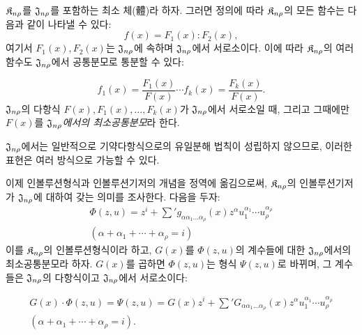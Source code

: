 $\mathfrak K_{n\rho}$를 $\mathfrak J_{n\rho}$를 포함하는 최소 체(體)라 하자. 그러면 정의에 따라 $\mathfrak K_{n\rho}$의 모든 함수는 다음과 같이 나타낼 수 있다:
\[
f(x)=F_1(x):F_2(x),
\]
여기서 $F_1(x),F_2(x)$는 $\mathfrak J_{n\rho}$에 속하며 $\mathfrak J_{n\rho}$에서 서로소이다. 이에 따라 $\mathfrak K_{n\rho}$의 여러 함수도 $\mathfrak J_{n\rho}$에서 공통분모로 통분할 수 있다:

\[
f_1(x)=\frac{F_1(x)}{F(x)}\cdots f_k(x)=\frac{F_k(x)}{F(x)}.
\]
$\mathfrak J_{n\rho}$의 다항식 $F(x),F_1(x),\ldots,F_k(x)$가 $\mathfrak J_{n\rho}$에서 서로소일 때, 그리고 그때에만 $F(x)$를 \emph{$\mathfrak J_{n\rho}$에서의 최소공통분모}라 한다.

$\mathfrak J_{n\rho}$에서는 일반적으로 기약다항식으로의 유일분해 법칙이 성립하지 않으므로, 이러한 표현은 여러 방식으로 가능할 수 있다.

이제 인볼루션형식과 인볼루션기저의 개념을 정역에 옮김으로써, $\mathfrak K_{n\rho}$의 인볼루션기저가 $\mathfrak J_{n\rho}$에 대하여 갖는 의미를 조사한다. 다음을 두자:
\[
\begin{gathered}
\Phi(z,u)=z^i+\sum{}' g_{\alpha\alpha_1\ldots\alpha_\rho}(x)z^\alpha u_1^{\alpha_1}\cdots u_\rho^{\alpha_\rho}\\
(\alpha+\alpha_1+\cdots+\alpha_\rho=i)
\end{gathered}
\]
이를 $\mathfrak K_{n\rho}$의 인볼루션형식이라 하고, $G(x)$를 $\Phi(z,u)$의 계수들에 대한 $\mathfrak J_{n\rho}$에서의 최소공통분모라 하자. $G(x)$를 곱하면 $\Phi(z,u)$는 형식 $\Psi(z,u)$로 바뀌며, 그 계수들은 $\mathfrak J_{n\rho}$의 다항식이고 $\mathfrak J_{n\rho}$에서 서로소이다:

\[
\begin{gathered}
G(x)\cdot\Phi(z,u)=\Psi(z,u)=G(x)z^i+\sum{}'G_{\alpha\alpha_1\ldots\alpha_\rho}(x)z^\alpha u_1^{\alpha_1}\cdots u_\rho^{\alpha_\rho}\\
(\alpha+\alpha_1+\cdots+\alpha_\rho=i).
\end{gathered}
\]

